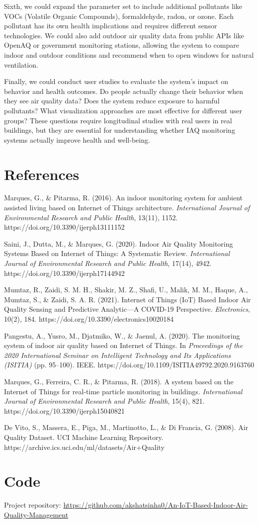 \documentclass[12pt]{report}
\begin{document}
Sixth, we could expand the parameter set to include additional pollutants like VOCs (Volatile Organic Compounds), formaldehyde, radon, or ozone. Each pollutant has its own health implications and requires different sensor technologies. We could also add outdoor air quality data from public APIs like OpenAQ or government monitoring stations, allowing the system to compare indoor and outdoor conditions and recommend when to open windows for natural ventilation.

Finally, we could conduct user studies to evaluate the system's impact on behavior and health outcomes. Do people actually change their behavior when they see air quality data? Does the system reduce exposure to harmful pollutants? What visualization approaches are most effective for different user groups? These questions require longitudinal studies with real users in real buildings, but they are essential for understanding whether IAQ monitoring systems actually improve health and well-being.

\section{References}
\begin{thebibliography}{9}
Marques, G., \& Pitarma, R. (2016). An indoor monitoring system for ambient assisted living based on Internet of Things architecture. \emph{International Journal of Environmental Research and Public Health}, 13(11), 1152. https://doi.org/10.3390/ijerph13111152

Saini, J., Dutta, M., \& Marques, G. (2020). Indoor Air Quality Monitoring Systems Based on Internet of Things: A Systematic Review. \emph{International Journal of Environmental Research and Public Health}, 17(14), 4942. https://doi.org/10.3390/ijerph17144942

Mumtaz, R., Zaidi, S. M. H., Shakir, M. Z., Shafi, U., Malik, M. M., Haque, A., Mumtaz, S., \& Zaidi, S. A. R. (2021). Internet of Things (IoT) Based Indoor Air Quality Sensing and Predictive Analytic—A COVID-19 Perspective. \emph{Electronics}, 10(2), 184. https://doi.org/10.3390/electronics10020184

Pangestu, A., Yusro, M., Djatmiko, W., \& Jaenul, A. (2020). The monitoring system of indoor air quality based on Internet of Things. In \emph{Proceedings of the 2020 International Seminar on Intelligent Technology and Its Applications (ISITIA)} (pp. 95--100). IEEE. https://doi.org/10.1109/ISITIA49792.2020.9163760

Marques, G., Ferreira, C. R., \& Pitarma, R. (2018). A system based on the Internet of Things for real-time particle monitoring in buildings. \emph{International Journal of Environmental Research and Public Health}, 15(4), 821. https://doi.org/10.3390/ijerph15040821

De Vito, S., Massera, E., Piga, M., Martinotto, L., \& Di Francia, G. (2008). Air Quality Dataset. UCI Machine Learning Repository. https://archive.ics.uci.edu/ml/datasets/Air+Quality
\end{thebibliography}

\section{Code}
Project repository: \url{https://github.com/akshatsinha0/An-IoT-Based-Indoor-Air-Quality-Management}
\end{document}
